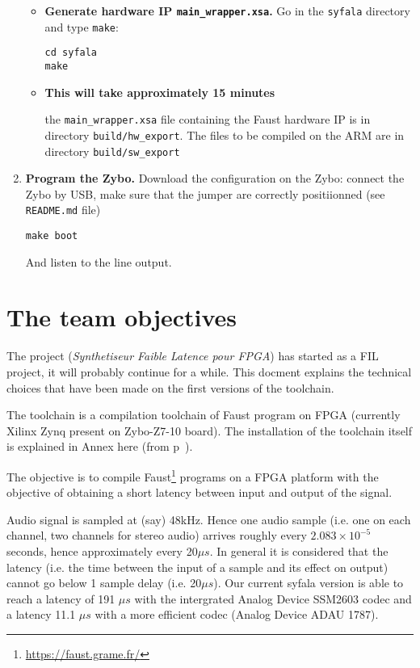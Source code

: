 \begin{enumerate}
\begin{itemize}
\item {\bf Generate hardware IP {\tt main\_wrapper.xsa}.} Go in the {\tt syfala} directory  and type {\tt make}:\\
\begin{boxedminipage}{\textwidth}
\begin{verbatim}
cd syfala
make
\end{verbatim}
\end{boxedminipage}
\item {\bf This will take approximately 15 minutes }

the {\tt main\_wrapper.xsa} file containing the Faust hardware IP is in directory {\tt build/hw\_export}. The files to be compiled on the ARM are in directory {\tt build/sw\_export}
\end{itemize}
\item {\bf Program the Zybo.}   Download the configuration on the Zybo: connect the Zybo by USB, make sure that the jumper are correctly positiionned (see {\tt README.md} file) 
\begin{boxedminipage}{\textwidth}
\begin{verbatim}
make boot
\end{verbatim}
\end{boxedminipage}
And  listen to the line output.

\end{enumerate}


\section{The \syfala team objectives}
The \syfala project ({\em Synthetiseur Faible Latence pour FPGA}) has started as a FIL project, it will probably continue for a while. This docment explains the technical choices that have been made on the first versions of the \syfala toolchain.

The \syfala toolchain is a compilation toolchain of Faust program on FPGA (currently Xilinx Zynq present on Zybo-Z7-10 board). The installation of the toolchain itself is explained  in Annex here (from p~\pageref{Annex1}).

The objective is to compile Faust\footnote{\url{https://faust.grame.fr/}} programs on a FPGA platform with the objective of obtaining a short latency between input and output of the signal.

Audio signal is sampled at (say) 48kHz. Hence one audio sample (i.e. one on each channel, two channels for stereo audio) arrives roughly every $2.083 \times 10^{-5}$ seconds, hence approximately every 20$\mu s$. In general it is considered that the latency (i.e. the time between the input of a sample and its effect on output) cannot go below 1 sample delay (i.e. 20$\mu s$). Our current syfala version is able to reach a latency of 191 $\mu s$ with the intergrated Analog Device SSM2603 codec and a latency 11.1 $\mu s$ with a more efficient codec (Analog Device ADAU 1787).


